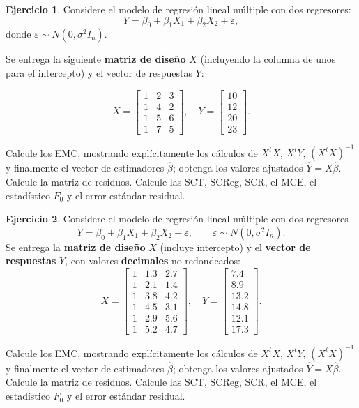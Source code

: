 \documentclass[
  11pt,
]{book}
\theoremstyle{definition}
\theoremstyle{definition}
\theoremstyle{definition}
\newtheorem{exercise}{Ejercicio}[chapter]
\theoremstyle{definition}
\theoremstyle{remark}
\begin{document}
\begin{exercise}
Considere el modelo de regresión lineal múltiple con dos regresores:
\[
Y = \beta_0 + \beta_1 X_1 + \beta_2 X_2 + \varepsilon,
\]
donde \(\varepsilon \sim N(0,\sigma^2I_n)\).

Se entrega la siguiente \textbf{matriz de diseño} \(X\) (incluyendo la columna de unos para el intercepto) y el vector de respuestas \(Y\):

\[
X =
\begin{bmatrix}
1 & 2 & 3 \\
1 & 4 & 2 \\
1 & 5 & 6 \\
1 & 7 & 5
\end{bmatrix},
\quad
Y =
\begin{bmatrix}
10 \\
12 \\
20 \\
23
\end{bmatrix}.
\]

Calcule los EMC, mostrando explícitamente los cálculos de \(X^tX\), \(X^tY\), \((X^tX)^{-1}\) y finalmente el vector de estimadores \(\hat\beta\); obtenga los valores ajustados \(\hat Y=X\hat\beta\). Calcule la matriz de residuos. Calcule las SCT, SCReg, SCR, el MCE, el estadístico \(F_0\) y el error estándar residual.
\end{exercise}

\begin{exercise}
Considere el modelo de regresión lineal múltiple con dos regresores
\[
Y=\beta_0+\beta_1X_1+\beta_2X_2+\varepsilon,\qquad \varepsilon\sim N(0,\sigma^2I_n).
\]
Se entrega la \textbf{matriz de diseño} \(X\) (incluye intercepto) y el \textbf{vector de respuestas} \(Y\), con valores \textbf{decimales} no redondeados:
\[
X=
\begin{bmatrix}
1 & 1.3 & 2.7\\
1 & 2.1 & 1.4\\
1 & 3.8 & 4.2\\
1 & 4.5 & 3.1\\
1 & 2.9 & 5.6\\
1 & 5.2 & 4.7
\end{bmatrix},\quad
Y=
\begin{bmatrix}
7.4\\
8.9\\
13.2\\
14.8\\
12.1\\
17.3
\end{bmatrix}.
\]

Calcule los EMC, mostrando explícitamente los cálculos de \(X^tX\), \(X^tY\), \((X^tX)^{-1}\) y finalmente el vector de estimadores \(\hat\beta\); obtenga los valores ajustados \(\hat Y=X\hat\beta\). Calcule la matriz de residuos. Calcule las SCT, SCReg, SCR, el MCE, el estadístico \(F_0\) y el error estándar residual.
\end{exercise}
\end{document}
